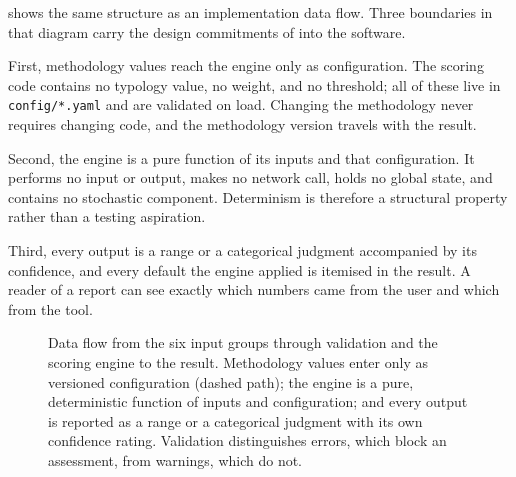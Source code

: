  shows the same structure as an implementation data flow.
Three boundaries in that diagram carry the design commitments of
 into the software.

First, methodology values reach the engine only as configuration. The
scoring code contains no typology value, no weight, and no threshold; all of
these live in \texttt{config/*.yaml} and are validated on load. Changing the
methodology never requires changing code, and the methodology version travels
with the result.

Second, the engine is a pure function of its inputs and that configuration. It
performs no input or output, makes no network call, holds no global state, and
contains no stochastic component. Determinism is therefore a structural
property rather than a testing aspiration.

Third, every output is a range or a categorical judgment accompanied by its
confidence, and every default the engine applied is itemised in the result. A
reader of a report can see exactly which numbers came from the user and which
from the tool.

\begin{figure}[htbp]
\centering
\resizebox{\textwidth}{!}{}
\caption[Input, engine, and output data flow]{Data flow from the six input
groups through validation and the scoring engine to the result. Methodology
values enter only as versioned configuration (dashed path); the engine is a
pure, deterministic function of inputs and configuration; and every output is
reported as a range or a categorical judgment with its own confidence rating.
Validation distinguishes errors, which block an assessment, from warnings,
which do not.}
\label{fig:dataflow}
\end{figure}
